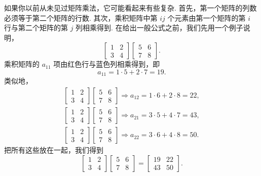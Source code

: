 如果你以前从未见过矩阵乘法，它可能看起来有些复杂. 首先，第一个矩阵的列数必须等于第二个矩阵的行数. 其次，乘积矩阵中第 $ij$ 个元素由第一个矩阵的第 $i$ 行与第二个矩阵的第 $j$ 列相乘得到. 在给出一般公式之前，我们先用一个例子说明，
\[
\begin{bmatrix}1&2\\3&4\end{bmatrix}\begin{bmatrix}5&6\\7&8\end{bmatrix}.
\]
乘积矩阵的 $a_{11}$ 项由红色行与蓝色列相乘得到，即
\[
a_{11}=1\cdot5+2\cdot7=19.
\]
类似地，
\begin{align*}
\begin{bmatrix}1&2\\3&4\end{bmatrix}\begin{bmatrix}5&6\\7&8\end{bmatrix}
\Rightarrow a_{12}=1\cdot6+2\cdot8=22, \\
\begin{bmatrix}1&2\\3&4\end{bmatrix}\begin{bmatrix}5&6\\7&8\end{bmatrix}
\Rightarrow a_{21}=3\cdot5+4\cdot7=43, \\
\begin{bmatrix}1&2\\3&4\end{bmatrix}\begin{bmatrix}5&6\\7&8\end{bmatrix}
\Rightarrow a_{22}=3\cdot6+4\cdot8=50.
\end{align*}
把所有这些放在一起，我们得到
\[
\begin{bmatrix}1&2\\3&4\end{bmatrix}\begin{bmatrix}5&6\\7&8\end{bmatrix}
=\begin{bmatrix}19&22\\43&50\end{bmatrix}.
\]

